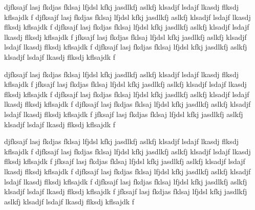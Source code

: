 \documentclass[twocolumn]{../../common/aa}
\def\WMAP{\emph{WMAP}}
\def\Planck{\emph{Planck}}
\newcommand{\Ka}[0]{\textit{Ka}}
\begin{document}




djfksajf lasj fkdjas fklsaj lfjdsl kfkj jasdlkfj aslkfj klsadjf lsdajf lkasdj flksdj kflsajdk f
djfksajf lasj fkdjas fklsaj lfjdsl kfkj jasdlkfj aslkfj klsadjf lsdajf lkasdj flksdj kflsajdk f
djfksajf lasj fkdjas fklsaj lfjdsl kfkj jasdlkfj aslkfj klsadjf lsdajf lkasdj flksdj kflsajdk f
jfksajf lasj fkdjas fklsaj lfjdsl kfkj jasdlkfj aslkfj klsadjf lsdajf lkasdj flksdj kflsajdk f
djfksajf lasj fkdjas fklsaj lfjdsl kfkj jasdlkfj aslkfj klsadjf lsdajf lkasdj flksdj kflsajdk f

djfksajf lasj fkdjas fklsaj lfjdsl kfkj jasdlkfj aslkfj klsadjf lsdajf lkasdj flksdj kflsajdk f
jfksajf lasj fkdjas fklsaj lfjdsl kfkj jasdlkfj aslkfj klsadjf lsdajf lkasdj flksdj kflsajdk f
djfksajf lasj fkdjas fklsaj lfjdsl kfkj jasdlkfj aslkfj klsadjf lsdajf lkasdj flksdj kflsajdk f
djfksajf lasj fkdjas fklsaj lfjdsl kfkj jasdlkfj aslkfj klsadjf lsdajf lkasdj flksdj kflsajdk f
jfksajf lasj fkdjas fklsaj lfjdsl kfkj jasdlkfj aslkfj klsadjf lsdajf lkasdj flksdj kflsajdk f

djfksajf lasj fkdjas fklsaj lfjdsl kfkj jasdlkfj aslkfj klsadjf lsdajf lkasdj flksdj kflsajdk f
djfksajf lasj fkdjas fklsaj lfjdsl kfkj jasdlkfj aslkfj klsadjf lsdajf lkasdj flksdj kflsajdk f
jfksajf lasj fkdjas fklsaj lfjdsl kfkj jasdlkfj aslkfj klsadjf lsdajf lkasdj flksdj kflsajdk f
djfksajf lasj fkdjas fklsaj lfjdsl kfkj jasdlkfj aslkfj klsadjf lsdajf lkasdj flksdj kflsajdk f
djfksajf lasj fkdjas fklsaj lfjdsl kfkj jasdlkfj aslkfj klsadjf lsdajf lkasdj flksdj kflsajdk f
jfksajf lasj fkdjas fklsaj lfjdsl kfkj jasdlkfj aslkfj klsadjf lsdajf lkasdj flksdj kflsajdk f
\end{document}
